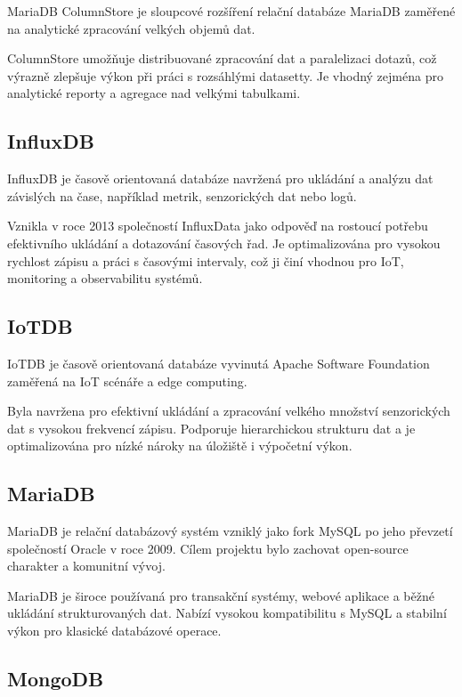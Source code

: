 MariaDB ColumnStore je sloupcové rozšíření relační databáze MariaDB zaměřené na analytické zpracování velkých objemů dat. 

ColumnStore umožňuje distribuované zpracování dat a paralelizaci dotazů, což výrazně zlepšuje výkon při práci s rozsáhlými datasetty. 
Je vhodný zejména pro analytické reporty a agregace nad velkými tabulkami. \cite{mariadbcolumnstore}

\subsection{InfluxDB}

InfluxDB je časově orientovaná databáze navržená pro ukládání a analýzu dat závislých na čase, například metrik, senzorických dat nebo logů.

Vznikla v roce 2013 společností InfluxData jako odpověď na rostoucí potřebu efektivního ukládání a dotazování časových řad. 
Je optimalizována pro vysokou rychlost zápisu a práci s časovými intervaly, což ji činí vhodnou pro IoT, monitoring a observabilitu systémů. \cite{influxdbdocs}

\subsection{IoTDB}

IoTDB je časově orientovaná databáze vyvinutá Apache Software Foundation zaměřená na IoT scénáře a edge computing.

Byla navržena pro efektivní ukládání a zpracování velkého množství senzorických dat s vysokou frekvencí zápisu. 
Podporuje hierarchickou strukturu dat a je optimalizována pro nízké nároky na úložiště i výpočetní výkon. \cite{iotdbdocs}

\subsection{MariaDB}

MariaDB je relační databázový systém vzniklý jako fork MySQL po jeho převzetí společností Oracle v roce 2009. Cílem projektu bylo zachovat open-source charakter a komunitní vývoj.

MariaDB je široce používaná pro transakční systémy, webové aplikace a běžné ukládání strukturovaných dat. 
Nabízí vysokou kompatibilitu s MySQL a stabilní výkon pro klasické databázové operace. \cite{mariadbdocs}

\subsection{MongoDB}

